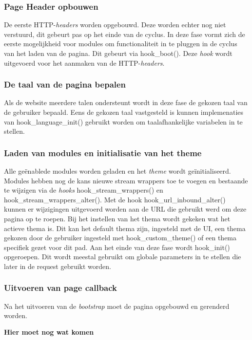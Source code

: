 \subsubsection{Page Header opbouwen}
De eerste HTTP-\textit{headers} worden opgebouwd. Deze worden echter nog niet verstuurd, dit gebeurt pas op het einde van de cyclus. In deze fase vormt zich de eerste mogelijkheid voor modules om functionaliteit in te pluggen in de cyclus van het laden van de pagina. Dit gebeurt via hook\_boot(). Deze \textit{hook} wordt uitgevoerd voor het aanmaken van de HTTP-\textit{headers}.

\subsubsection{De taal van de pagina bepalen}
Als de website meerdere talen ondersteunt wordt in deze fase de gekozen taal van de gebruiker bepaald. Eens de gekozen taal vastgesteld is kunnen implemenaties van hook\_language\_init() gebruikt worden om taalafhankelijke variabelen in te stellen.

\subsubsection{Laden van modules en initialisatie van het theme}
Alle ge\"{e}nablede modules worden geladen en het \textit{theme} wordt ge\"{i}nitialiseerd. Modules hebben nog de kans nieuwe stream wrappers toe te voegen en bestaande te wijzigen via de \textit{hooks} hook\_stream\_wrappers() en hook\_stream\_wrappers\_alter(). Met de hook hook\_url\_inbound\_alter() kunnen er wijzigingen uitgevoerd worden aan de URL die gebruikt werd om deze pagina op te roepen. Bij het instellen van het thema wordt gekeken wat het actieve thema is. Dit kan het default thema zijn, ingesteld met de UI, een thema gekozen door de gebruiker ingesteld met hook\_custom\_theme() of een thema specifiek gezet voor dit pad. Aan het einde van deze fase wordt hook\_init() opgeroepen. Dit wordt meestal gebruikt om globale parameters in te stellen die later in de request gebruikt worden.

\subsubsection{Uitvoeren van page callback}
Na het uitvoeren van de \textit{bootstrap} moet de pagina opgebouwd en gerenderd worden. 

\textbf{Hier moet nog wat komen}

